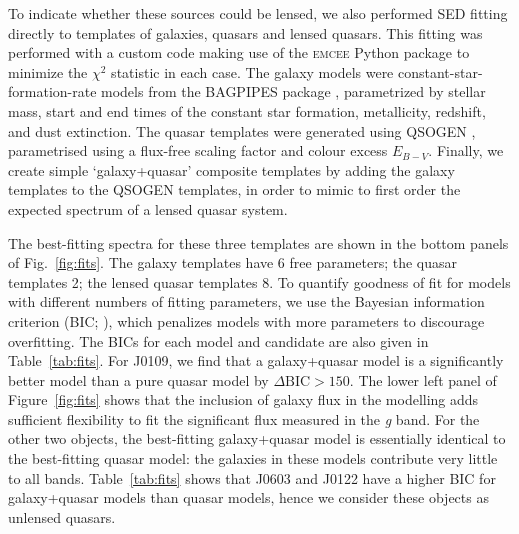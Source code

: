 \documentclass[fleqn,usenatbib]{mnras}
\begin{document}
To indicate whether these sources could be lensed, we also performed SED fitting directly to templates of galaxies, quasars and lensed quasars.
This fitting was performed with a custom code making use of the \textsc{emcee} Python package \citep{emcee} to minimize the $\chi^2$ statistic in each case.
The galaxy models were constant-star-formation-rate models from the \textsc{BAGPIPES} package \citep{carnall18}, parametrized by stellar mass, start and end times of the constant star formation, metallicity, redshift, and dust extinction. 
The quasar templates were generated using \textsc{QSOGEN} \citep{temple22}, parametrised using a flux-free scaling factor and colour excess $E_{B-V}$.
Finally, we create simple `galaxy+quasar' composite templates by adding the galaxy templates to the \textsc{QSOGEN} templates, in order to mimic to first order the expected spectrum of a lensed quasar system.

The best-fitting spectra for these three templates are shown in the bottom panels of Fig.~\ref{fig:fits}.
The galaxy templates have 6 free parameters; the quasar templates 2; the lensed quasar templates 8.
To quantify goodness of fit for models with different numbers of fitting parameters, we use the Bayesian information criterion (BIC; \citealt{schwarz78}), which penalizes models with more parameters to discourage overfitting.
The BICs for each model and candidate are also given in Table~\ref{tab:fits}.
For J0109, we find that a galaxy+quasar model is a significantly better model than a pure quasar model by $\Delta\text{BIC}>150$.
The lower left panel of Figure~\ref{fig:fits} shows that the inclusion of galaxy flux in the modelling adds sufficient flexibility to fit the significant flux measured in the \textit{g} band.
For the other two objects, the best-fitting galaxy+quasar model is essentially identical to the best-fitting quasar model: the galaxies in these models contribute very little to all bands.
Table~\ref{tab:fits} shows that J0603 and J0122 have a higher BIC for galaxy+quasar models than quasar models, hence we consider these objects as unlensed quasars.
\end{document}
